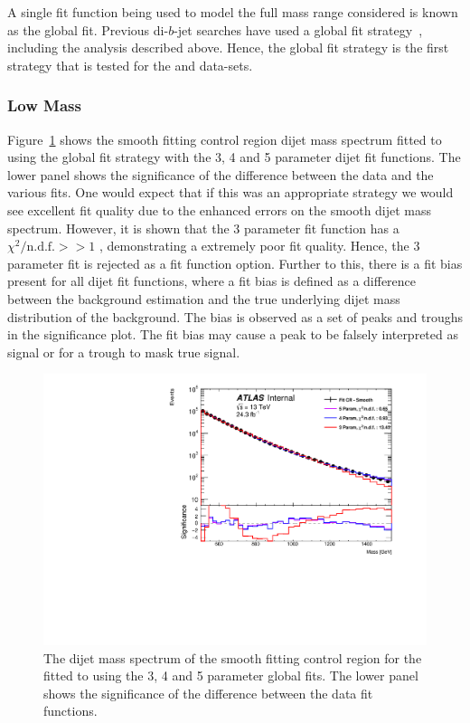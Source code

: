 A single fit function being used to model the full mass range considered is known as the global fit.
Previous di-$b$-jet searches have used a global fit strategy~\cite{dibjet-mori16_paper}, including the \summer{} analysis described above.
Hence, the global fit strategy is the first strategy that is tested for the \lm{} and \hm{} data-sets.

\subsubsection{Low Mass}
\label{sec:lowmass_globalFit}

Figure~\ref{fig:lowmass_globalFit} shows the smooth fitting control region dijet mass spectrum fitted to
using the global fit strategy with the 3, 4 and 5 parameter dijet fit functions.
The lower panel shows the significance of the difference between the data and the various fits.
One would expect that if this was an appropriate strategy we would see excellent fit quality due to the enhanced errors on the smooth dijet mass spectrum.
However, it is shown that the 3 parameter fit function has a $\chi^{2}/\text{n.d.f.} >> 1$ , demonstrating a extremely poor fit quality.
Hence, the 3 parameter fit is rejected as a fit function option.
Further to this, there is a fit bias present for all dijet fit functions,
where a fit bias is defined as a difference between the background estimation and the true underlying dijet mass distribution of the background.
The bias is observed as a set of peaks and troughs in the significance plot.
The fit bias may cause a peak to be falsely interpreted as signal or for a trough to mask true signal. 

\begin{figure}[!htb]
\centering
\includegraphics[scale=0.5, angle=0]{figs/Dibjet/LowMass/FitStudy/globalFit_lm_dH.pdf}
\vspace{10pt}
\caption{\label{fig:lowmass_globalFit}
  The dijet mass spectrum of the smooth fitting control region for the \lm{}
  fitted to using the 3, 4 and 5 parameter global fits.
  The lower panel shows the significance of the difference between the data fit functions.}
\end{figure}

